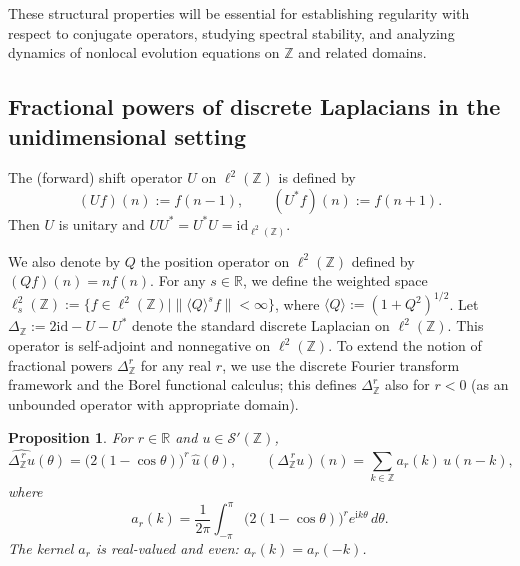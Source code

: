 \documentclass[10pt]{amsart} %
\newcommand{\R}{{\mathbb{R}}}
\newcommand{\Z}{{\mathbb{Z}}}
\newcommand{\1}{{\mathbb{I}}}
\numberwithin{equation}{section}
\newtheorem{proposition}[theorem]{Proposition}%
\begin{document}
These structural properties will be essential for establishing regularity with respect to conjugate operators, studying spectral stability, and analyzing dynamics of nonlocal evolution equations on $\mathbb{Z}$ and related domains.


\subsection{Fractional powers of discrete Laplacians in the unidimensional setting}
The (forward) shift operator \(U\) on \(\ell^2(\mathbb{Z})\) is defined by
\[
(Uf)(n):=f(n-1),\qquad (U^*f)(n):=f(n+1).
\]
Then \(U\) is unitary and \(UU^*=U^*U=\mathrm{id}_{\ell^2(\mathbb{Z})}\).

We also denote by \(Q\) the position operator on \(\ell^2(\mathbb{Z})\) defined by \((Q f)(n) = n f(n)\).
For any \(s \in \mathbb{R}\), we define the weighted space \(\ell^2_s(\mathbb{Z}) := \{f \in \ell^2(\mathbb{Z}) \mid \| \langle Q \rangle^s f \| < \infty\}\), where \(\langle Q \rangle := (1 + Q^2)^{1/2}\).
Let \(\Delta_{\mathbb{Z}} := 2 \mathrm{id} - U - U^*\) denote the standard discrete Laplacian on \(\ell^2(\mathbb{Z})\).
This operator is self-adjoint and nonnegative on \(\ell^2(\mathbb{Z})\).
To extend the notion of fractional powers \(\Delta^r_{\mathbb{Z}}\) for any real \(r\), we use the discrete Fourier transform framework and the Borel functional calculus; this defines \(\Delta^r_{\mathbb{Z}}\) also for \(r<0\) (as an unbounded operator with appropriate domain).


\begin{proposition}\label{prop:all-r}
For $r\in\R$ and $u\in\mathcal S'(\Z)$,
\[
\widehat{\Delta_{\Z}^{\,r}u}(\theta)=\bigl(2(1-\cos\theta)\bigr)^r\,\widehat u(\theta),\qquad
(\Delta_{\Z}^{\,r}u)(n)=\sum_{k\in\Z}a_r(k)\,u(n-k),
\]
where
\[
a_r(k)=\frac{1}{2\pi}\int_{-\pi}^{\pi}\bigl(2(1-\cos\theta)\bigr)^r e^{\mathrm{i}k\theta}\,d\theta.
\]
The kernel $a_r$ is real-valued and even: $a_r(k)=a_r(-k)$.
\end{proposition}
\end{document}
